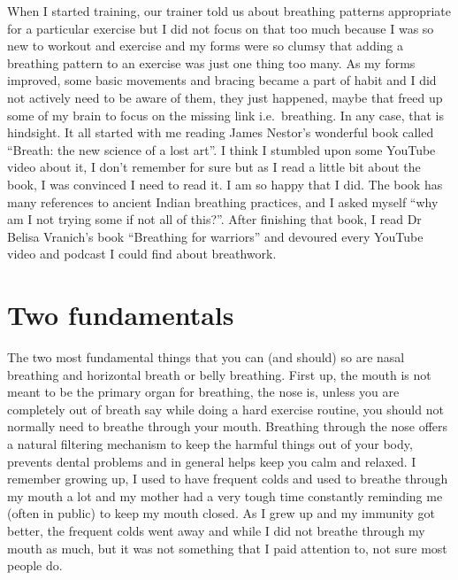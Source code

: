 \documentclass[
  oneside]{book}
\begin{document}
When I started training, our trainer told us about breathing patterns appropriate for a particular exercise but I did not focus on that too much because I was so new to workout and exercise and my forms were so clumsy that adding a breathing pattern to an exercise was just one thing too many. As my forms improved, some basic movements and bracing became a part of habit and I did not actively need to be aware of them, they just happened, maybe that freed up some of my brain to focus on the missing link i.e.~breathing. In any case, that is hindsight. It all started with me reading James Nestor's wonderful book called ``Breath: the new science of a lost art''. I think I stumbled upon some YouTube video about it, I don't remember for sure but as I read a little bit about the book, I was convinced I need to read it. I am so happy that I did. The book has many references to ancient Indian breathing practices, and I asked myself ``why am I not trying some if not all of this?''. After finishing that book, I read Dr Belisa Vranich's book ``Breathing for warriors'' and devoured every YouTube video and podcast I could find about breathwork.

\hypertarget{two-fundamentals}{%
\section{Two fundamentals}\label{two-fundamentals}}

The two most fundamental things that you can (and should) so are nasal breathing and horizontal breath or belly breathing. First up, the mouth is not meant to be the primary organ for breathing, the nose is, unless you are completely out of breath say while doing a hard exercise routine, you should not normally need to breathe through your mouth. Breathing through the nose offers a natural filtering mechanism to keep the harmful things out of your body, prevents dental problems and in general helps keep you calm and relaxed. I remember growing up, I used to have frequent colds and used to breathe through my mouth a lot and my mother had a very tough time constantly reminding me (often in public) to keep my mouth closed. As I grew up and my immunity got better, the frequent colds went away and while I did not breathe through my mouth as much, but it was not something that I paid attention to, not sure most people do.
\end{document}
